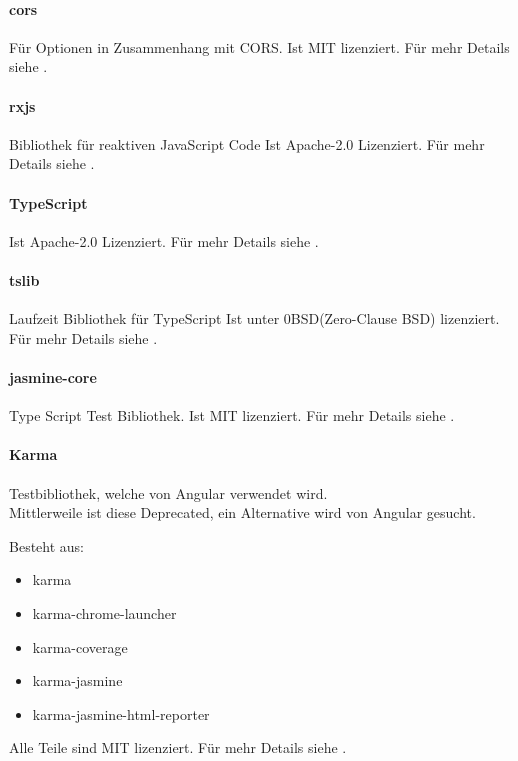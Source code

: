 \paragraph{cors}
Für Optionen in Zusammenhang mit CORS.
Ist MIT lizenziert.
Für mehr Details siehe .

\paragraph{rxjs}
Bibliothek für reaktiven JavaScript Code
Ist Apache-2.0 Lizenziert.
Für mehr Details siehe .

\paragraph{TypeScript}
Ist Apache-2.0 Lizenziert.
Für mehr Details siehe .

\paragraph{tslib}
Laufzeit Bibliothek für TypeScript
Ist unter 0BSD(Zero-Clause BSD) lizenziert.
Für mehr Details siehe .


\paragraph{jasmine-core}
Type Script Test Bibliothek.
Ist MIT lizenziert.
Für mehr Details siehe .

\paragraph{Karma}
Testbibliothek, welche von Angular verwendet wird.\\
Mittlerweile ist diese Deprecated, ein Alternative wird von Angular gesucht.

Besteht aus:
\begin{itemize}
    \item karma
    \item karma-chrome-launcher
    \item karma-coverage
    \item karma-jasmine
    \item karma-jasmine-html-reporter
\end{itemize}

Alle Teile sind MIT lizenziert.
Für mehr Details siehe .



